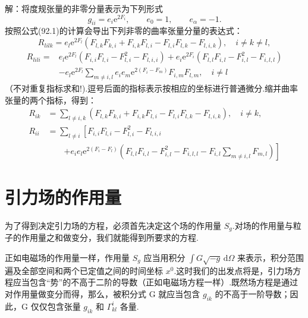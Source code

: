 \begin{xiti}
解：将度规张量的非零分量表示为下列形式
\begin{equation*}
  g_{ii}=e_i\mathrm{e}^{2F_i},\qquad e_0=1,\qquad e_{\alpha}=-1.
\end{equation*}
按照公式(92.1)的计算会导出下列非零的曲率张量分量的表达式：
\begin{equation*}
  R_{lilk}=e_l\mathrm{e}^{2F_l}\left(F_{l,k}F_{k,i}
  +F_{i,k}F_{l,i}-F_{l,i}F_{l,k}-F_{l,i,k}\right),
  \quad i\neq k\neq l,
\end{equation*}
\begin{equation*}
\begin{aligned}
  R_{lili}={}&e_l\mathrm{e}^{2F_l}\left(F_{i,i}F_{l,i}
  -F_{l,i}^2-F_{l,i,i}\right)
  +e_i\mathrm{e}^{2F_i}\left(F_{l,l}F_{i,l}
  -F_{i,l}^2-F_{i,l,l}\right)\\
  &-e_l\mathrm{e}^{2F_l}\sum_{m\neq i,l}e_ie_m
  \mathrm{e}^{2(F_i-F_m)}F_{i,m}F_{l,m},
  \quad i\neq l
\end{aligned}
\end{equation*}
（不对重复指标求和!).逗号后面的指标表示按相应的坐标进行普通微分.缩并曲率张量的两个指标，得到：
\begin{equation*}
\begin{aligned}
  R_{ik}&=\sum_{l\neq i,k}\left(F_{l,k}F_{k,i}
  +F_{i,k}F_{l,i}-F_{l,i}F_{l,k}-F_{l,i,k}\right),
  \quad i\neq k,\\
  R_{ii}&=\sum_{l\neq i}\left[F_{i,i}F_{l,i}
  -F_{l,i}^2-F_{l,i,i}\right.\\
  &\qquad\left.+e_ie_l\mathrm{e}^{2(F_i-F_l)}
  \left(F_{l,l}F_{i,l}-F_{i,l}^2-F_{i,l,l}
  -F_{i,l}\sum_{m\neq i,l}F_{m,l}\right)\right]
\end{aligned}
\end{equation*}

\end{xiti}

\section{引力场的作用量}

为了得到决定引力场的方程，必须首先决定这个场的作用量 $S_g$.对场的作用量与粒子的作用量之和做变分，我们就能得到所要求的方程.

正如电磁场的作用量一样，作用量 $S_g$ 应当用积分 $\int G\sqrt{-g}\,\mathrm{d}\varOmega$ 来表示，积分范围遍及全部空间和两个已定值之间的时间坐标 $x^0$.这时我们的出发点将是，引力场方程应当包含“势”的不高于二阶的导数（正如电磁场方程一样）.既然场方程是通过对作用量做变分而得，那么，被积分式 G 就应当包含 $g_{ik}$ 的不高于一阶导数；因此，G 仅仅包含张量 $g_{ik}$ 和 $\Gamma^i_{kl}$ 各量.

